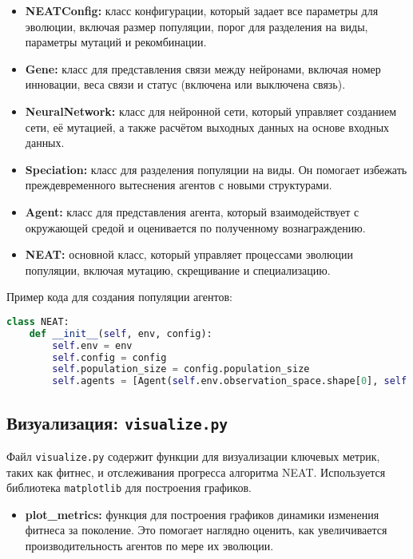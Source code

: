 \documentclass[a4paper,12pt]{article}
\begin{document}
\begin{itemize}
    \item \textbf{NEATConfig:} класс конфигурации, который задает все параметры для эволюции, включая размер популяции, порог для разделения на виды, параметры мутаций и рекомбинации.
    \item \textbf{Gene:} класс для представления связи между нейронами, включая номер инновации, веса связи и статус (включена или выключена связь).
    \item \textbf{NeuralNetwork:} класс для нейронной сети, который управляет созданием сети, её мутацией, а также расчётом выходных данных на основе входных данных.
    \item \textbf{Speciation:} класс для разделения популяции на виды. Он помогает избежать преждевременного вытеснения агентов с новыми структурами.
    \item \textbf{Agent:} класс для представления агента, который взаимодействует с окружающей средой и оценивается по полученному вознаграждению.
    \item \textbf{NEAT:} основной класс, который управляет процессами эволюции популяции, включая мутацию, скрещивание и специализацию.
\end{itemize}

Пример кода для создания популяции агентов:

\begin{lstlisting}[language=Python]
class NEAT:
    def __init__(self, env, config):
        self.env = env
        self.config = config
        self.population_size = config.population_size
        self.agents = [Agent(self.env.observation_space.shape[0], self.env.action_space.shape[0]) for _ in range(self.population_size)]
\end{lstlisting}

\subsection{Визуализация: \texttt{visualize.py}}

Файл \texttt{visualize.py} содержит функции для визуализации ключевых метрик, таких как фитнес, и отслеживания прогресса алгоритма NEAT. Используется библиотека \texttt{matplotlib} для построения графиков.

\begin{itemize}
    \item \textbf{plot\_metrics:} функция для построения графиков динамики изменения фитнеса за поколение. Это помогает наглядно оценить, как увеличивается производительность агентов по мере их эволюции.
\end{itemize}
\end{document}
